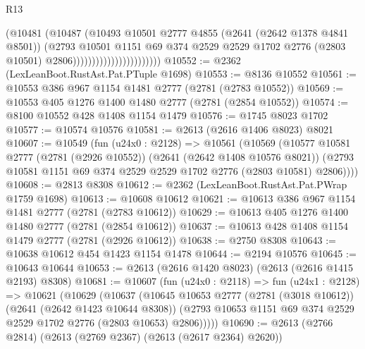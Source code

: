 \begin{lexlean}{R13}
\begin{coremodule}
                                          (@10481
                                            (@10487
                                              (@10493
                                                @10501
                                                @2777
                                                @4855
                                                (@2641 (@2642 @1378 @4841 @8501))
                                                (@2793
                                                  @10501
                                                  @1151
                                                  @69
                                                  @374
                                                  @2529
                                                  @2529
                                                  @1702
                                                  @2776
                                                  (@2803 @10501)
                                                  @2806)))))))))))))))))))))))
@10552 := @2362 (LexLeanBoot.RustAst.Pat.PTuple @1698)
@10553 := @8136 @10552
@10561 := @10553 @386 @967 @1154 @1481 @2777 (@2781 (@2783 @10552))
@10569 := @10553 @405 @1276 @1400 @1480 @2777 (@2781 (@2854 @10552))
@10574 := @8100 @10552 @428 @1408 @1154 @1479
@10576 := @1745 @8023 @1702
@10577 := @10574 @10576
@10581 := @2613 (@2616 @1406 @8023) @8021
@10607 := @10549
    (fun (u24x0 : @2128) =>
    @10561
      (@10569
        (@10577
          @10581
          @2777
          (@2781 (@2926 @10552))
          (@2641 (@2642 @1408 @10576 @8021))
          (@2793 @10581 @1151 @69 @374 @2529 @2529 @1702 @2776 (@2803 @10581) @2806))))
@10608 := @2813 @8308
@10612 := @2362 (LexLeanBoot.RustAst.Pat.PWrap @1759 @1698)
@10613 := @10608 @10612
@10621 := @10613 @386 @967 @1154 @1481 @2777 (@2781 (@2783 @10612))
@10629 := @10613 @405 @1276 @1400 @1480 @2777 (@2781 (@2854 @10612))
@10637 := @10613 @428 @1408 @1154 @1479 @2777 (@2781 (@2926 @10612))
@10638 := @2750 @8308
@10643 := @10638 @10612 @454 @1423 @1154 @1478
@10644 := @2194 @10576
@10645 := @10643 @10644
@10653 := @2613 (@2616 @1420 @8023) (@2613 (@2616 @1415 @2193) @8308)
@10681 := @10607
    (fun (u24x0 : @2118) =>
    fun (u24x1 : @2128) =>
    @10621
      (@10629
        (@10637
          (@10645
            @10653
            @2777
            (@2781 (@3018 @10612))
            (@2641 (@2642 @1423 @10644 @8308))
            (@2793 @10653 @1151 @69 @374 @2529 @2529 @1702 @2776 (@2803 @10653) @2806)))))
@10690 := @2613 (@2766 @2814) (@2613 (@2769 @2367) (@2613 (@2617 @2364) @2620))

\end{coremodule}
\end{lexlean}
